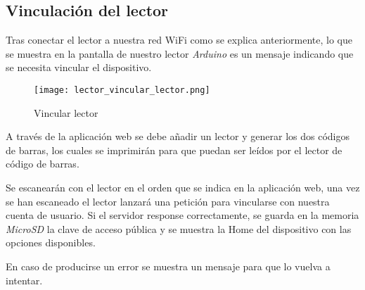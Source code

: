 \subsection{Vinculación del lector}

Tras conectar el lector a nuestra red WiFi como se explica anteriormente, lo que se muestra en la pantalla de nuestro lector \emph{Arduino} es un mensaje indicando que se necesita vincular el dispositivo.

\begin{figure}[h!]
    \centering
    \texttt{[image: lector\_vincular\_lector.png]}
    \caption{Vincular lector}\label{fig:lector_vincular_lector_1}
\end{figure}


A través de la aplicación web se debe añadir un lector y generar los dos códigos de barras, los cuales se imprimirán para que puedan ser leídos por el lector de código de barras.

Se escanearán con el lector en el orden que se indica en la aplicación web, una vez se han escaneado el lector lanzará una petición para vincularse con nuestra cuenta de usuario. Si el servidor response correctamente, se guarda en la memoria \emph{MicroSD} la clave de acceso pública y se muestra la Home del dispositivo con las opciones disponibles.

En caso de producirse un error se muestra un mensaje para que lo vuelva a intentar.